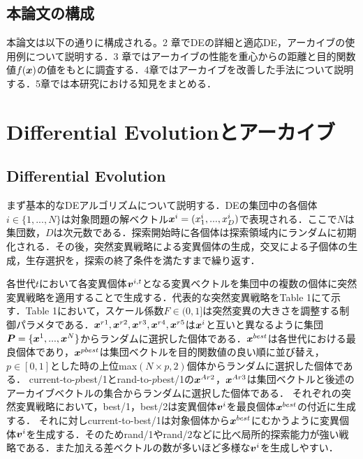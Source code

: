\documentclass[a4paper,11pt,oneside,openany]{jsbook}
\def\vector#1{\mbox{\boldmath $#1$}}
\begin{document}
\section{本論文の構成}
本論文は以下の通りに構成される。2 章でDEの詳細と適応DE，アーカイブの使用例について説明する．3 章ではアーカイブの性能を重心からの距離と目的関数値$f(\vector{x})$の値をもとに調査する．4章ではアーカイブを改善した手法について説明する．5章では本研究における知見をまとめる．

\chapter{Differential Evolutionとアーカイブ}
\section{Differential Evolution}
まず基本的なDEアルゴリズムについて説明する．DEの集団中の各個体$i \in \{1, ..., N\}$は対象問題の解ベクトル$\vector{x}^i = (x^i_1, ..., x^i_D)$で表現される．ここで$N$は集団数，$D$は次元数である．探索開始時に各個体は探索領域内にランダムに初期化される．その後，突然変異戦略による変異個体の生成，交叉による子個体の生成，生存選択を，探索の終了条件を満たすまで繰り返す．

各世代$t$において各変異個体${\vector{v}^{i,t}}$となる変異ベクトルを集団中の複数の個体に突然変異戦略を適用することで生成する．代表的な突然変異戦略をTable 1にて示す．Table 1において，スケール係数${F\in(0,1]}$は突然変異の大きさを調整する制御パラメタである．$\vector{x}^{r1},\vector{x}^{r2},\vector{x}^{r3},\vector{x}^{r4},\vector{x}^{r5}$は${\vector{x}^i}$と互いと異なるように集団$\vector{P} = \{ \vector{x}^1, ..., \vector{x}^N \}$からランダムに選択した個体である．$\vector{x}^{best}$は各世代における最良個体であり，$\vector{x}^{pbest}$は集団ベクトルを目的関数値の良い順に並び替え，${p\in[0,1]}とした時の上位$max$(N \times p, 2)$個体からランダムに選択した個体である．
current-to-$p$best/1とrand-to-$p$best/1の${\vector{x}^{Ar2}}$，${\vector{x}^{Ar3}}$は集団ベクトルと後述のアーカイブベクトルの集合からランダムに選択した個体である．
それぞれの突然変異戦略において，best/1，best/2は変異個体{$\vector{v}^i$}を最良個体$\vector{x}^{best}$の付近に生成する．
それに対しcurrent-to-best/1は対象個体から$\vector{x}^{best}$にむかうように変異個体{$\vector{v}^i$}を生成する．そのためrand/1やrand/2などに比べ局所的探索能力が強い戦略である．また加える差ベクトルの数が多いほど多様な{$\vector{v}^i$}を生成しやすい．
\end{document}
